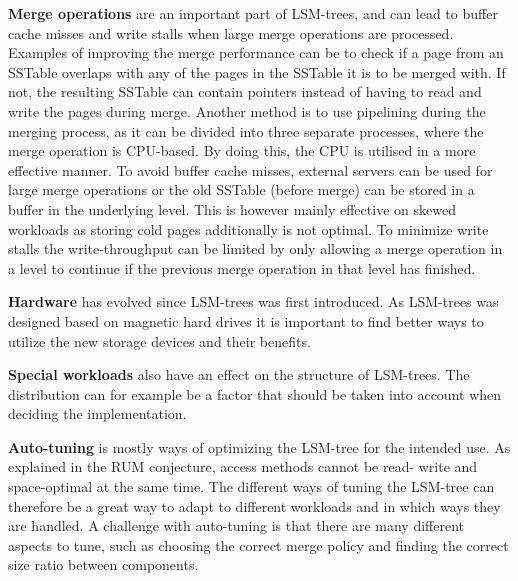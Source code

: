 \noindent
\textbf{Merge operations} are an important part of LSM-trees, and can lead to buffer cache misses and write stalls when large merge operations are processed. Examples of improving the merge performance can be to check if a page from an SSTable overlaps with any of the pages in the SSTable it is to be merged with. If not, the resulting SSTable can contain pointers instead of having to read and write the pages during merge\cite{VTTree}. Another method is to use pipelining during the merging process, as it can be divided into three separate processes, where the merge operation is CPU-based. By doing this, the CPU is utilised in a more effective manner\cite{ZhangEtAl}. To avoid buffer cache misses, external servers can be used for large merge operations\cite{AhmadEtAl} or the old SSTable (before merge) can be stored in a buffer in the underlying level\cite{LSbMTree1}\cite{LSbMTree2}. This is however mainly effective on skewed workloads as storing cold pages additionally is not optimal. To minimize write stalls the write-throughput can be limited by only allowing a merge operation in a level to continue if the previous merge operation in that level has finished\cite{bLSM}. \newline

\noindent
\textbf{Hardware} has evolved since LSM-trees was first introduced. As LSM-trees was designed based on magnetic hard drives it is important to find better ways to utilize the new storage devices and their benefits. \newline

\noindent
\textbf{Special workloads} also have an effect on the structure of LSM-trees. The distribution can for example be a factor that should be taken into account when deciding the implementation. \newline

\noindent
\textbf{Auto-tuning} is mostly ways of optimizing the LSM-tree for the intended use. As explained in the RUM conjecture\cite{RUM}, access methods cannot be read- write and space-optimal at the same time. The different ways of tuning the LSM-tree can therefore be a great way to adapt to different workloads and in which ways they are handled. A challenge with auto-tuning is that there are many different aspects to tune, such as choosing the correct merge policy and finding the correct size ratio between components.
